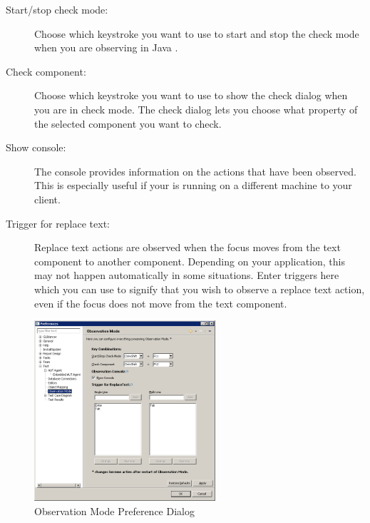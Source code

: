 
\begin{description}
\item[Start/stop check mode:]{ Choose which keystroke you want to use to start and stop the check mode when you are observing \gdcases{} in Java \gdauts{}.}
\item [Check component:]{Choose which keystroke you want to use to show the check dialog when you are in check mode. The check dialog lets you choose what property of the selected component you want to check.}
\item [Show console:]{The console provides information on the actions that have been observed. This is especially useful if your \gdaut{} is running on a different machine to your client. }
\item [Trigger for replace text:]{Replace text actions are observed when the focus moves from the text component to another component. Depending on your application, this may not happen automatically in some situations. Enter triggers here which you can use to signify that you wish to observe a replace text action, even if the focus does not move from the text component. }
\end{description}

\begin{figure}[h]
\begin{center}
\includegraphics[width=0.60\textwidth]{Tasks/Preferences/PS/obsprefsjava}
\caption{Observation Mode Preference Dialog}
\label{obsprefsjava}
\end{center}
\end{figure}
